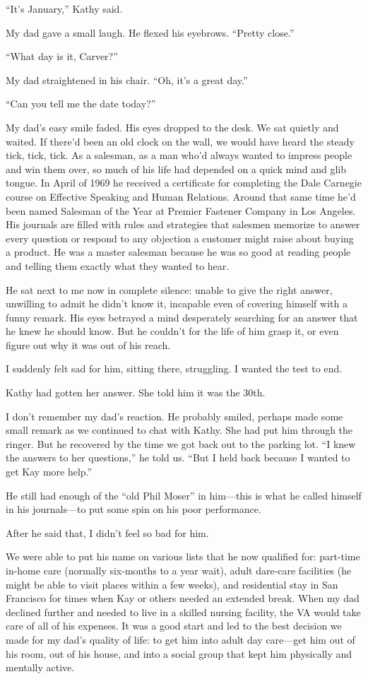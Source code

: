\documentclass[12pt]{book}
\begin{document}
``It's January,'' Kathy said.

My dad gave a small laugh. He flexed his eyebrows. ``Pretty close.''

``What day is it, Carver?''

My dad straightened in his chair. ``Oh, it's a great day.''

``Can you tell me the date today?''

My dad's easy smile faded. His eyes dropped to the desk. We sat quietly and waited. If there'd been an old clock on the wall, we would have heard the steady tick, tick, tick. As a salesman, as a man who'd always wanted to impress people and win them over, so much of his life had depended on a quick mind and glib tongue. In April of 1969 he received a certificate for completing the Dale Carnegie course on Effective Speaking and Human Relations. Around that same time he'd been named Salesman of the Year at Premier Fastener Company in Los Angeles. His journals are filled with rules and strategies that salesmen memorize to answer every question or respond to any objection a customer might raise about buying a product. He was a master salesman because he was so good at reading people and telling them exactly what they wanted to hear.

He sat next to me now in complete silence: unable to give the right answer, unwilling to admit he didn't know it, incapable even of covering himself with a funny remark. His eyes betrayed a mind desperately searching for an answer that he knew he should know. But he couldn't for the life of him grasp it, or even figure out why it was out of his reach.

I suddenly felt sad for him, sitting there, struggling. I wanted the test to end.

Kathy had gotten her answer. She told him it was the 30th.

I don't remember my dad's reaction. He probably smiled, perhaps made some small remark as we continued to chat with Kathy. She had put him through the ringer. But he recovered by the time we got back out to the parking lot. ``I knew the answers to her questions,'' he told us. ``But I held back because I wanted to get Kay more help.''

He still had enough of the ``old Phil Moser'' in him---this is what he called himself in his journals---to put some spin on his poor performance.

After he said that, I didn't feel so bad for him.

We were able to put his name on various lists that he now qualified for: part-time in-home care (normally six-months to a year wait), adult dare-care facilities (he might be able to visit places within a few weeks), and residential stay in San Francisco for times when Kay or others needed an extended break. When my dad declined further and needed to live in a skilled nursing facility, the VA would take care of all of his expenses. It was a good start and led to the best decision we made for my dad's quality of life: to get him into adult day care---get him out of his room, out of his house, and into a social group that kept him physically and mentally active.
\end{document}
